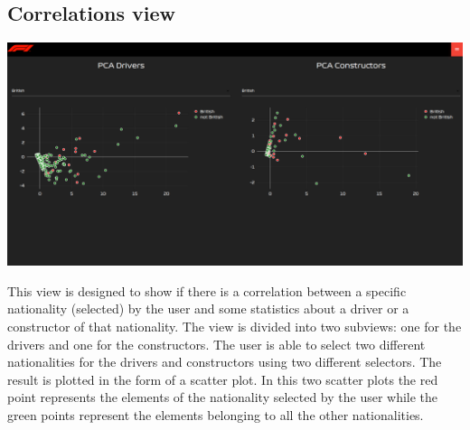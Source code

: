\documentclass[10pt,twocolumn,letterpaper]{article}
\begin{document}
\subsection{Correlations view}
\begin{center}
	\centering
	\includegraphics[width=\columnwidth]{correlations}
\end{center}
This view is designed to show if there is a correlation between a specific nationality (selected) by the user and some statistics about a driver or a 
constructor of that nationality. The view is divided into two subviews: one for the drivers and one for the constructors. The user is able to select two different nationalities
for the drivers and constructors using two different selectors. The result is plotted in the form of a scatter plot. In this two scatter plots the red point represents the elements
of the nationality selected by the user while the green points represent the elements belonging to all the other nationalities.
\end{document}
